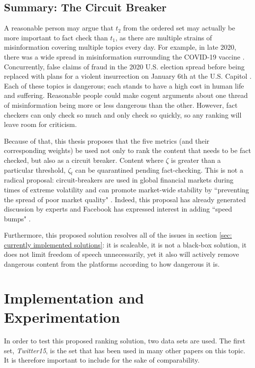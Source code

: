 \documentclass[preprint,review,12pt]{elsarticle}
\begin{document}
\subsection{Summary: The Circuit Breaker}
A reasonable person may argue that $t_2$ from the ordered set may actually be more important to fact check than $t_1$, as there are multiple strains of misinformation covering multiple topics every day.  For example, in late 2020, there was a wide spread in misinformation surrounding the COVID-19 vaccine \cite{mills2020covid,bagherpour2020covid}. Concurrently, false claims of fraud in the 2020 U.S. election \cite{dean2020facebook} spread before being replaced with plans for a violent insurrection on January 6th at the U.S. Capitol \cite{fandos2021trump,Levenson2021capitol}. Each of these topics is dangerous; each stands to have a high cost in human life and suffering. Reasonable people could make cogent arguments about one thread of misinformation being more or less dangerous than the other. However, fact checkers can only check so much and only check so quickly, so any ranking will leave room for criticism.

Because of that, this thesis proposes that the five metrics (and their corresponding weights) be used not only to rank the content that needs to be fact checked, but also as a circuit breaker. Content where $\zeta$ is greater than a particular threshold, $\zeta_t$ can be quarantined pending fact-checking. This is not a radical proposal: circuit-breakers are used in global financial markets during times of extreme volatility \cite{wang2019microstructure,schwert1990stock} and can promote market-wide stability by ``preventing the spread of poor market quality" \cite{brugler2014single,schneider2020stock}. Indeed, this proposal has already generated discussion by experts \cite{goodman2020digital,simpson2020fighting} and Facebook has expressed interest in adding ``speed bumps" \cite{bond2020circuit}.

Furthermore, this proposed solution resolves all of the issues in section \ref{sec: currently implemented solutions}: it is scaleable, it is not a black-box solution, it does not limit freedom of speech unnecessarily, yet it also will actively remove dangerous content from the platforms according to how dangerous it is.

\section{Implementation and Experimentation}
In order to test this proposed ranking solution, two data sets are used. The first set, \textit{Twitter15}, is the set that has been used in many other papers on this topic. It is therefore important to include for the sake of comparability.
\end{document}
